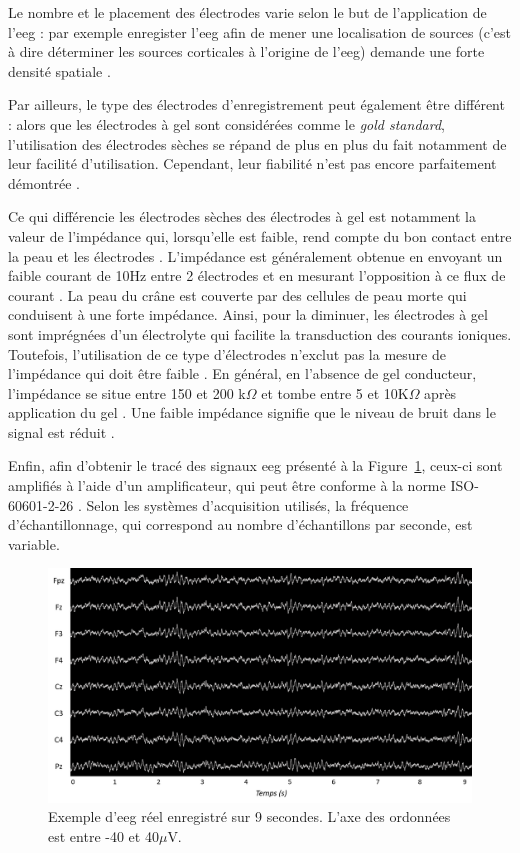Le nombre et le placement des électrodes varie selon le but de l'application de l'\gls{eeg} : par exemple enregister l'\gls{eeg} afin
de mener une localisation de sources (c'est à dire déterminer les sources corticales à l'origine de l'\gls{eeg}) demande une forte densité spatiale \citep{Lantz2003}. 

Par ailleurs, le type des électrodes d'enregistrement peut également être différent : 
alors que les électrodes à gel sont considérées comme le \textit{gold standard}, l'utilisation des électrodes sèches se répand de plus 
en plus du fait notamment de leur facilité d'utilisation. Cependant, leur fiabilité n'est pas encore parfaitement démontrée \citep{Lopez2014}. 

Ce qui différencie les électrodes sèches des électrodes à gel est notamment la valeur de l'impédance qui, lorsqu'elle est faible, rend compte du bon contact entre la peau et les électrodes \citep{Lopez2014}. 
L'impédance est généralement obtenue en envoyant un faible courant de 10Hz entre 2 électrodes et en mesurant l'opposition à ce flux de courant \citep{Kappenman2010}. La peau du crâne est 
couverte par des cellules de peau morte qui conduisent à une forte impédance.
Ainsi, pour la diminuer, les électrodes à gel sont imprégnées d'un électrolyte qui facilite la transduction des courants ioniques. Toutefois, l'utilisation de ce type d'électrodes 
n'exclut pas la mesure de l'impédance qui doit être faible \citep{Lopez2014}. En général, en l'absence de gel conducteur, l'impédance se
situe entre 150 et 200 k$\Omega$ et tombe entre 5 et 10K$\Omega$ après application du gel \citep{Lopez2014}. Une faible impédance signifie 
que le niveau de bruit dans le signal est réduit \citep{Kappenman2010}.

Enfin, afin d'obtenir le tracé des signaux \gls{eeg} présenté à la Figure~\ref{Figure:introduction_eeg_example}, ceux-ci sont amplifiés 
à l'aide d'un amplificateur, qui peut être conforme à la norme ISO-60601-2-26 \citep{ISO}. Selon les systèmes d'acquisition utilisés, la fréquence
d'échantillonnage, qui correspond au nombre d'échantillons par seconde, est variable.

\begin{figure}[h!]
  \centering
	\includegraphics[width=1\linewidth]{figures/chapter-1/introduction-eeg-example} 
  \caption[Exemple d'\gls{eeg} réel enregistré sur 9 secondes.]{Exemple d'\gls{eeg} réel enregistré sur 9 secondes. L'axe des ordonnées est entre -40 et 40$\mu$V.}
  \label{Figure:introduction_eeg_example}
\end{figure}

